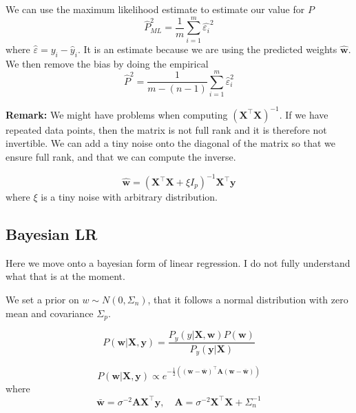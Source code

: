 \documentclass[11pt]{article}
\begin{document}
We can use the maximum likelihood estimate to estimate our value for $P$
\begin{equation}
  \hat{P}_{ML}^2 = \frac{1}{m} \sum_{i=1}^{m} \hat{\varepsilon_i} ^2
\end{equation}
where $\hat{\varepsilon} = y_i - \hat{y}_i$.
It is an estimate because we are using the predicted weights $\hat{\mathbf{w}}$.
We then remove the bias by doing the empirical
\begin{equation}
  \hat{P}^2 = \frac{1}{m - (n-1)} \sum_{i=1}^{m} \hat{\varepsilon}_i^2
\end{equation}

\textbf{Remark:}
We might have problems when computing $(\textbf{X}^\top \textbf{X})^{-1}$.
If we have repeated data points, then the matrix is not full rank and it is therefore not invertible.
We can add a tiny noise onto the diagonal of the matrix so that we ensure full rank, and that we can compute the inverse.

\begin{equation}
  \hat{\mathbf{w}} = (\textbf{X}^\top \textbf{X} + \xi I_p)^{-1} \textbf{X}^\top \textbf{y}
\end{equation}
where $\xi$ is a tiny noise with arbitrary distribution.

\subsection{Bayesian LR}
Here we move onto a bayesian form of linear regression.
I do not fully understand what that is at the moment.

We set a prior on $w \sim N(0,\Sigma_n)$, that it follows a normal distribution with zero mean and covariance $\Sigma_p$.

\begin{equation}
  P(\textbf{w} | \textbf{X}, \textbf{y}) = \frac{P_y(y|\textbf{X},\textbf{w}) P(\textbf{w})}{P_y(\textbf{y} | \textbf{X})}
\end{equation}

\begin{equation}
  P(\textbf{w} | \mathbf{X}, \mathbf{y}) \propto e^{-\frac{1}{2}((\textbf{w} - \bar{\textbf{w}})^\top \textbf{A} (\textbf{w} - \bar{\textbf{w}}) )}
\end{equation}
where 
\begin{equation}
  \bar{\textbf{w}} = \sigma^{-2} \textbf{A} \textbf{X}^\top \textbf{y}, \quad \textbf{A} = \sigma^{-2} \textbf{X}^\top \textbf{X} + \Sigma_n^{-1}
\end{equation}
\end{document}
